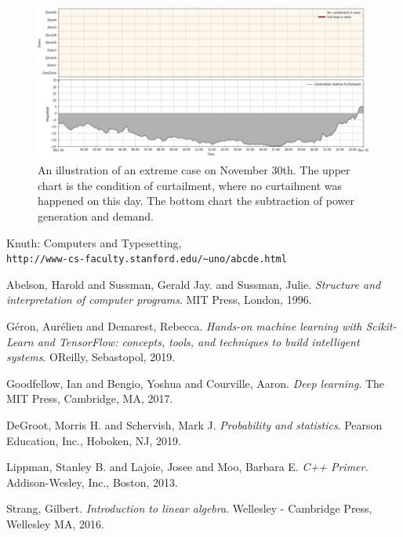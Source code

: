 \documentclass[12pt,a4paper]{report}
\begin{document}
    \begin{figure}[ht]
        \centerline{\includegraphics[scale=1.95]{extreme_case}}
        \caption{An illustration of an extreme case on November 30th. The upper chart is the condition of curtailment, where no curtailment was happened on this day. The bottom chart the subtraction of power generation and demand.}
        \label{fig_extreme_case}
    \end{figure}


    \cleardoublepage  
    \begin{thebibliography}{99}
        
        Knuth: Computers and Typesetting,
        \\\texttt{http://www-cs-faculty.stanford.edu/\~{}uno/abcde.html}

        Abelson, Harold and Sussman, Gerald Jay. and Sussman, Julie. 
        \textit{Structure and interpretation of computer programs}. 
        MIT Press, London, 1996.

        Géron, Aurélien and Demarest, Rebecca. 
        \textit{Hands-on machine learning with Scikit-Learn and TensorFlow: concepts, tools, and techniques to build intelligent systems}. 
        OReilly, Sebastopol, 2019.

        Goodfellow, Ian and Bengio, Yoshua and Courville, Aaron. 
        \textit{Deep learning}. 
        The MIT Press, Cambridge, MA, 2017.

        DeGroot, Morris H. and Schervish, Mark J. 
        \textit{Probability and statistics}. 
        Pearson Education, Inc., Hoboken, NJ, 2019.

        Lippman, Stanley B. and Lajoie, Josee and Moo, Barbara E. 
        \textit{C++ Primer}. 
        Addison-Wesley, Inc., Boston, 2013.

        Strang, Gilbert. 
        \textit{Introduction to linear algebra}. 
        Wellesley - Cambridge Press, Wellesley MA, 2016.



    \end{thebibliography}
    \renewcommand{\bibname}{References}

    \cleardoublepage  
    
    
\end{document}
